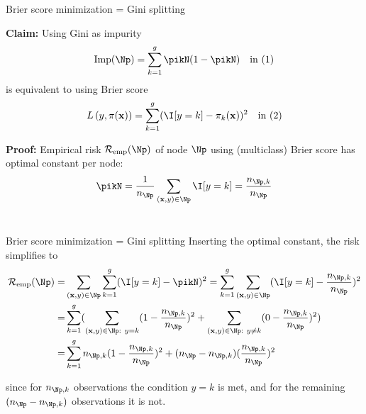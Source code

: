\documentclass[11pt,compress,t,notes=noshow, xcolor=table]{beamer}
\begin{document}
\begin{frame}{Brier score minimization = Gini splitting}

\textbf{Claim:} Using Gini as impurity
$$\text{Imp}(\Np) = \sum_{k=1}^g \pikN (1-\pikN ) \quad \text{in (1)}$$
is equivalent to using Brier score 
$$\Lpixy = \sum_{k = 1}^g (\I [y=k] - \pi_k(\xv))^2 \quad \text{in (2)}$$



\vfill

\textbf{Proof:} Empirical risk $\riske(\Np)$ of node $\Np$ using (multiclass) Brier score has optimal constant per node: 
$$\pikN = \frac{1}{n_{\Np}} \sum\limits_{(\xv,y) \in \Np} \I [y=k] = \frac{n_{\Np,k}}{n_{\Np }}$$ \\

\vfill



\end{frame}
\begin{frame2}[small]{Brier score minimization = Gini splitting}
Inserting the optimal constant, the risk simplifies to
\begin{align*}
\riske(\Np) =& \sum_{\xy \in \Np}  \sum_{k = 1}^g (\I [y=k] - \pikN)^2 
= \sum_{k = 1}^g \sum_{\xy \in \Np} (\I [y=k] - \frac{n_{\Np,k}}{n_{\Np }})^2\\
=& \sum_{k = 1}^{g} (\sum_{\xy \in \Np: ~ y = k} (1 - \frac{n_{\Np,k}}{n_{\Np }})^2 + \sum_{\xy \in \Np: ~ y \ne k} (0 - \frac{n_{\Np,k}}{n_{\Np }})^2) \\
=& \sum_{k = 1}^g n_{\Np,k}(1 - \frac{n_{\Np,k}}{n_{\Np }})^2 + (n_{\Np } - n_{\Np,k})(\frac{n_{\Np,k}}{n_{\Np }})^2
\end{align*}

\vfill

since for $n_{\Np,k}$ observations the condition $y = k$ is met, and for the remaining $(n_\Np - n_{\Np,k})$ observations it is not. 

\end{frame2}
\end{document}
